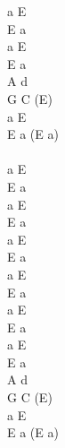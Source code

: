 \documentclass[a5paper, 10pt]{book}
\begin{document}
\begin{minipage}[t]{0.2\textwidth}
a E\\
E a\\
a E\\
E a\\
A d\\
G  C (E)\\
a E\\
E  a (E a)\\
\\
 a E\\
E a\\
 a E\\
E a\\

 a E\\
E a\\
 a E\\
E a\\

a E\\
E a\\
a E\\
E a\\
A d\\
G  C (E)\\
a E\\
E  a (E a)\\
\end{minipage}

\newpage
\end{document}
